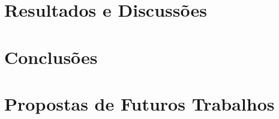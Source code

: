 	\chapter{Resultados e Discussões}

	\chapter{Conclusões}

	\chapter{Propostas de Futuros Trabalhos}

	\postextual
	

